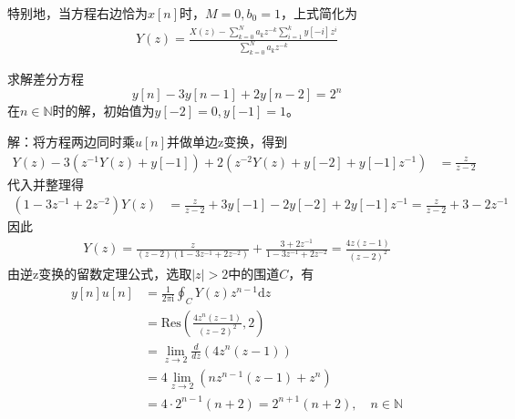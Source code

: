 特别地，当方程右边恰为$x[n]$时，$M=0,b_0=1$，上式简化为\begin{align*}
    Y(z)=\frac{X(z)-\sum_{k=0}^{N}a_k z^{-k}\sum_{i=1}^{k}y[-i]z^{i}}{\sum_{k=0}^{N}a_k z^{-k}}
\end{align*}

\begin{example}
    求解差分方程
    $$y[n]-3y[n-1]+2y[n-2]=2^n$$
    在$n\in\mathbb{N}$时的解，初始值为$y[-2]=0,y[-1]=1$。

    解：将方程两边同时乘$u[n]$并做单边z变换，得到\begin{align*}
    Y(z)-3(z^{-1}Y(z)+y[-1])+2(z^{-2}Y(z)+y[-2]+y[-1]z^{-1})&=\frac{z}{z-2}
    \end{align*}
    代入并整理得\begin{align*}
    (1-3z^{-1}+2z^{-2})Y(z)&=\frac{z}{z-2}+3y[-1]-2y[-2]+2y[-1]z^{-1}=\frac{z}{z-2}+3-2z^{-1}
    \end{align*}
    因此\begin{align*}
    Y(z)=\frac{z}{(z-2)(1-3z^{-1}+2z^{-2})}+\frac{3+2z^{-1}}{1-3z^{-1}+2z^{-2}}=\frac{4z(z-1)}{(z-2)^2}
    \end{align*}
    由逆z变换的留数定理公式，选取$|z|>2$中的围道$C$，有\begin{align*}
    y[n]u[n]&=\frac{1}{2\pi\mathrm{i}}\oint_{C}Y(z)z^{n-1}\mathrm{d}z\\
    &=\mathrm{Res}\left(\frac{4z^n(z-1)}{(z-2)^2},2\right)\\
    &=\lim_{z\to 2}\frac{d}{dz}\left(4z^n(z-1)\right)\\
    &=4\lim_{z\to 2}\left(nz^{n-1}(z-1)+z^n\right)\\
    &=4\cdot 2^{n-1}(n+2)=2^{n+1}(n+2),\quad n\in\mathbb{N}
\end{align*}
\end{example}
